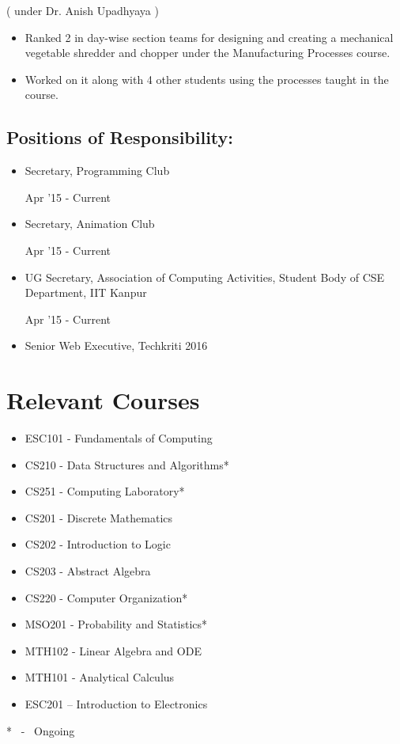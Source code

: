 \documentclass{cv}
\begin{document}
( under Dr. Anish Upadhyaya )
\begin{itemize}
\item Ranked 2 in day-wise section teams for designing and creating a mechanical vegetable shredder and chopper
under the Manufacturing Processes course.
\item Worked on it along with 4 other students using the processes taught in the course.
\end{itemize}

\subsection*{Positions of Responsibility:}
\begin{itemize}
\item Secretary, Programming Club
\begin{flushright}
Apr '15 - Current
\end{flushright}
\item Secretary, Animation Club
\begin{flushright}
Apr '15 - Current
\end{flushright}
\item UG Secretary, Association of Computing Activities, Student Body of CSE Department, IIT Kanpur
\begin{flushright}
Apr '15 - Current
\end{flushright}
\item Senior Web Executive, Techkriti 2016
\end{itemize}

\section*{Relevant Courses}
\begin{multicols}{2}	
\begin{itemize}
\item ESC101 - Fundamentals of Computing
\item CS210 - Data Structures and Algorithms*
\item CS251 - Computing Laboratory*
\item CS201 - Discrete Mathematics
\item CS202 - Introduction to Logic
\item CS203 - Abstract Algebra
\item CS220 - Computer Organization*
\item MSO201 - Probability and Statistics*
\item MTH102 - Linear Algebra and ODE
\item MTH101 - Analytical Calculus
\item ESC201 – Introduction to Electronics
\end{itemize}
\end{multicols}
\begin{flushright}
* \ - \ Ongoing
\end{flushright}
\end{document}
